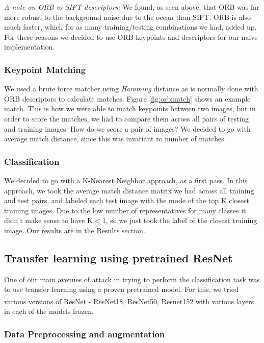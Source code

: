 \textit{A note on ORB vs SIFT descriptors:} We found, as seen above, that ORB was far more robust to the background noise due to the ocean than SIFT. ORB is also much faster, which for as many training/testing combinations we had, added up. For these reasons we decided to use ORB keypoints and descriptors for our naive implementation. 

\subsubsection{Keypoint Matching}

We used a brute force matcher using \textit{Hamming} distance as is normally done with ORB descriptors to calculate matches. Figure \ref{fig:orbmatch} shows an example match. This is how we were able to match keypoints between two images, but in order to score the matches, we had to compare them across all pairs of testing and training images. How do we score a pair of images? We decided to go with average match distance, since this was invariant to number of matches.

\subsubsection{Classification}

We decided to go with a K-Nearest Neighbor approach, as a first pass. In this approach, we took the average match distance matrix we had across all training and test pairs, and labeled each test image with the mode of the top K closest training images. Due to the low number of representatives for many classes it didn't make sense to have K$<$1, so we just took the label of the closest training image. Our results are in the Results section.

\subsection{Transfer learning using pretrained ResNet}

One of our main avenues of attack in trying to perform the classification task was to use transfer learning using a proven pretrained model. For this, we tried various versions of ResNet\textsuperscript{\cite{he2016deep}} - ResNet18, ResNet50, Resnet152 with various layers in each of the models frozen.

\subsubsection{Data Preprocessing and augmentation}

